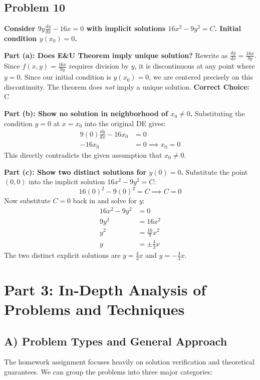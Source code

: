 \documentclass[12pt]{article}
\begin{document}
\subsection*{Problem 10}
\textbf{Consider $9y\frac{dy}{dx} - 16x = 0$ with implicit solutions $16x^2 - 9y^2 = C$. Initial condition $y(x_0)=0$.}

\textbf{Part (a): Does E\&U Theorem imply unique solution?}
Rewrite as $\frac{dy}{dx} = \frac{16x}{9y}$. Since $f(x,y) = \frac{16x}{9y}$ requires division by $y$, it is discontinuous at any point where $y=0$. Since our initial condition is $y(x_0)=0$, we are centered precisely on this discontinuity. The theorem does \textit{not} imply a unique solution.
\textbf{Correct Choice:} C

\textbf{Part (b): Show no solution in neighborhood of $x_0 \neq 0$.}
Substituting the condition $y=0$ at $x=x_0$ into the original DE gives:
\begin{align*}
    9(0)\frac{dy}{dx} - 16x_0 &= 0 \\
    -16x_0 &= 0 \implies x_0 = 0
\end{align*}
This directly contradicts the given assumption that $x_0 \neq 0$.

\textbf{Part (c): Show two distinct solutions for $y(0)=0$.}
Substitute the point $(0,0)$ into the implicit solution $16x^2 - 9y^2 = C$:
\[ 16(0)^2 - 9(0)^2 = C \implies C = 0 \]
Now substitute $C = 0$ back in and solve for $y$:
\begin{align*}
    16x^2 - 9y^2 &= 0 \\
    9y^2 &= 16x^2 \\
    y^2 &= \frac{16}{9}x^2 \\
    y &= \pm \frac{4}{3}x
\end{align*}
The two distinct explicit solutions are $y = \frac{4}{3}x$ and $y = -\frac{4}{3}x$.

\newpage
\section{Part 3: In-Depth Analysis of Problems and Techniques}

\subsection{A) Problem Types and General Approach}
The homework assignment focuses heavily on solution verification and theoretical guarantees. We can group the problems into three major categories:
\end{document}
